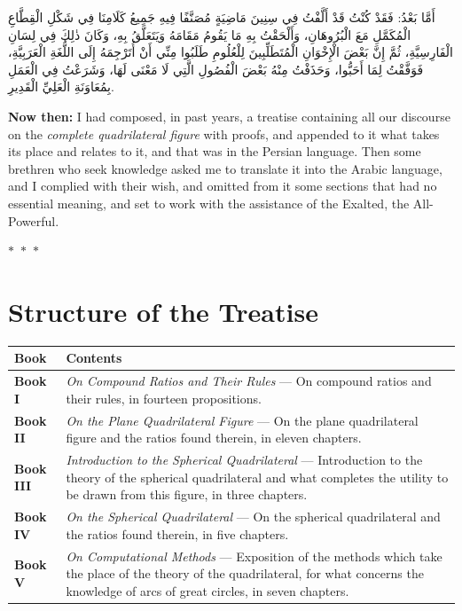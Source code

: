 \documentclass[11pt,a4paper]{article}
\theoremstyle{plain}
\theoremstyle{definition}
\theoremstyle{remark}
\newcommand{\ar}[1]{{\arabicfont\beginR #1\endR}}
\newcommand{\bilingualpair}[2]{%
  \par\noindent
  \begin{minipage}[t]{0.48\textwidth}
  #1
  \end{minipage}%
  \hfill
  \begin{minipage}[t]{0.48\textwidth}
  \vspace*{0pt}#2
  \end{minipage}\par\vspace{0.3cm}%
}
\newcommand{\ornament}{\begin{center}\textcolor{goldaccent}{$\ast$~$\ast$~$\ast$}\end{center}}
\begin{document}
\bilingualpair{\ar{أَمَّا بَعْدُ: فَقَدْ كُنْتُ قَدْ أَلَّفْتُ فِي سِنِينَ مَاضِيَةٍ مُصَنَّفًا فِيهِ جَمِيعُ كَلَامِنَا فِي شَكْلِ الْقِطَّاعِ الْمُكَمَّلِ مَعَ الْبُرُوهَانِ، وَأَلْحَقْتُ بِهِ مَا يَقُومُ مَقَامَهُ وَيَتَعَلَّقُ بِهِ، وَكَانَ ذٰلِكَ فِي لِسَانِ الْفَارِسِيَّةِ، ثُمَّ إِنَّ بَعْضَ الْإِخْوَانِ الْمُتَطَلِّبِينَ لِلْعُلُومِ طَلَبُوا مِنِّي أَنْ أُتَرْجِمَهُ إِلَى اللُّغَةِ الْعَرَبِيَّةِ، فَوَفَّقْتُ لِمَا أَحَبُّوا، وَحَذَفْتُ مِنْهُ بَعْضَ الْفُصُولِ الَّتِي لَا مَعْنَى لَهَا، وَشَرَعْتُ فِي الْعَمَلِ بِمُعَاوَنَةِ الْعَلِيِّ الْقَدِيرِ.}}{\noindent\textbf{Now then:} I had composed, in past years, a treatise containing all our discourse on the \textit{complete quadrilateral figure} with proofs, and appended to it what takes its place and relates to it, and that was in the Persian language. Then some brethren who seek knowledge asked me to translate it into the Arabic language, and I complied with their wish, and omitted from it some sections that had no essential meaning, and set to work with the assistance of the Exalted, the All-Powerful.}

\ornament

\section*{Structure of the Treatise}

\begin{center}
\begin{longtable}{lp{10cm}}
\toprule
\textbf{Book} & \textbf{Contents} \\
\midrule
\endhead

\textbf{Book I} & \textit{On Compound Ratios and Their Rules} --- On compound ratios and their rules, in fourteen propositions. \\
\addlinespace[0.3cm]

\textbf{Book II} & \textit{On the Plane Quadrilateral Figure} --- On the plane quadrilateral figure and the ratios found therein, in eleven chapters. \\
\addlinespace[0.3cm]

\textbf{Book III} & \textit{Introduction to the Spherical Quadrilateral} --- Introduction to the theory of the spherical quadrilateral and what completes the utility to be drawn from this figure, in three chapters. \\
\addlinespace[0.3cm]

\textbf{Book IV} & \textit{On the Spherical Quadrilateral} --- On the spherical quadrilateral and the ratios found therein, in five chapters. \\
\addlinespace[0.3cm]

\textbf{Book V} & \textit{On Computational Methods} --- Exposition of the methods which take the place of the theory of the quadrilateral, for what concerns the knowledge of arcs of great circles, in seven chapters. \\
\bottomrule
\end{longtable}
\end{center}
\end{document}
